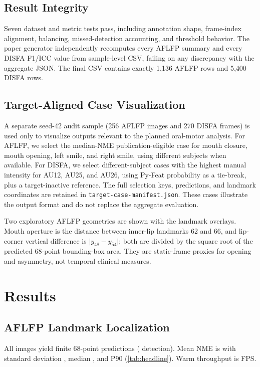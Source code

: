 \documentclass[10pt,journal]{IEEEtran}
\newcommand{\code}[1]{\texttt{#1}}
\begin{document}
\subsection{Result Integrity}

Seven dataset and metric tests pass, including annotation shape, frame-index
alignment, balancing, missed-detection accounting, and threshold behavior.
The paper generator independently recomputes every AFLFP summary and every
DISFA F1/ICC value from sample-level CSV, failing on any discrepancy with the
aggregate JSON. The final CSV contains exactly 1,136 AFLFP rows and 5,400
DISFA rows.

\subsection{Target-Aligned Case Visualization}

A separate seed-42 audit sample (256 AFLFP images and 270 DISFA frames) is
used only to visualize outputs relevant to the planned oral-motor analysis.
For AFLFP, we select the median-NME publication-eligible case for mouth
closure, mouth opening, left smile, and right smile, using different subjects
when available. For DISFA, we select different-subject cases with the highest
manual intensity for AU12, AU25, and AU26, using Py-Feat probability as a
tie-break, plus a target-inactive reference. The full selection keys,
predictions, and landmark coordinates are retained in
\code{target-case-manifest.json}. These cases illustrate the output format
and do not replace the aggregate evaluation.

Two exploratory AFLFP geometries are shown with the landmark overlays. Mouth
aperture is the distance between inner-lip landmarks 62 and 66, and
lip-corner vertical difference is $\lvert y_{48}-y_{54}\rvert$; both are
divided by the square root of the predicted 68-point bounding-box area. They
are static-frame proxies for opening and asymmetry, not temporal clinical
measures.

\section{Results}

\subsection{AFLFP Landmark Localization}

All \AFLFPSamples{} images yield finite 68-point predictions
(\AFLFPDetection{} detection). Mean NME is \AFLFPNMEMean{} with standard
deviation \AFLFPNMEStd{}, median \AFLFPNMEMedian{}, and P90
\AFLFPNMEP{} (\cref{tab:headline}). Warm throughput is \AFLFPFPS{} FPS.
\end{document}
